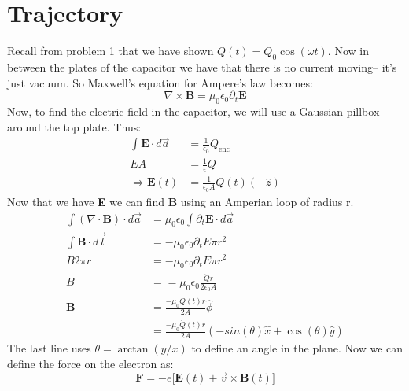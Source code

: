 \documentclass[a4paper, 11pt]{article}
\begin{document}
\section*{Trajectory} 
Recall from problem 1 that we have shown  $Q(t) = Q_0\cos(\omega t)$. Now in between the plates of the capacitor we have that there is no current moving-- it's just vacuum. So Maxwell's equation for Ampere's law becomes: 
	\begin{equation*}
		\nabla \times \mathbf{B} = \mu_0\epsilon_0\partial_t \mathbf{E} 
	\end{equation*}
Now, to find the electric field in the capacitor, we will use a Gaussian pillbox around the top plate. Thus: 
	\begin{align*}
		\int \mathbf{E} \cdot d\vec{a} &= \frac{1}{\epsilon_0}Q_{\text{enc}} \\ 
		EA &= \frac{1}{\epsilon}Q \\ 
		\Rightarrow \mathbf{E}(t)&= \frac{1}{\epsilon_0 A}Q(t)(-\hat{z})
	\end{align*}	
Now that we have \textbf{E} we can find \textbf{B} using an Amperian loop of radius r. 
	\begin{align*}
		\int (\nabla \cdot \mathbf{B})\cdot d\vec{a} &= \mu_0\epsilon_0\int\partial_t \mathbf{E} \cdot d\vec{a} \\ 
		\int \mathbf{B}\cdot d\vec{l} &= -\mu_0\epsilon_0\partial_t E \pi r^2 \\
		B2\pi r &= -\mu_0\epsilon_0\partial_t E \pi r^2  \\ 
		B &= =\mu_0\epsilon_0\frac{\dot{Q}r}{2\epsilon_0 A} \\ 
		\mathbf{B} &= \frac{-\mu_0 \dot{Q}(t)r}{2A}\hat{\phi} \\
					&=\frac{-\mu_0 \dot{Q}(t)r}{2A}(-sin(\theta)\hat{x} + \cos(\theta)\hat{y})
	\end{align*}
The last line uses $\theta = \arctan(y/x)$ to define an angle in the plane. Now we can define the force on the electron as: 
	\begin{equation}
		\mathbf{F} = -e\big[\mathbf{E}(t) + \vec{v}\times\mathbf{B}(t)\big]
	\end{equation}
\end{document}
